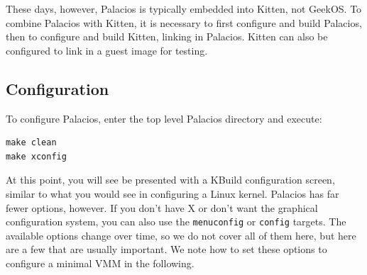 \documentclass[11pt]{article}
\begin{document}
These days, however, Palacios is typically embedded into Kitten, not
GeekOS.  To combine Palacios with Kitten, it is necessary to first
configure and build Palacios, then to configure and build Kitten,
linking in Palacios.   Kitten can also be configured to link in a
guest image for testing.  

\subsection{Configuration}

To configure Palacios, enter the top level Palacios directory and
execute:
\begin{verbatim}
make clean
make xconfig
\end{verbatim}
At this point, you will see be presented with a KBuild configuration
screen, similar to what you would see in configuring a Linux kernel.
Palacios has far fewer options, however.   If you don't have X or
don't want the graphical configuration system, you can also use the
\verb.menuconfig. or \verb.config. targets.  The available options
change over time, so we do not cover all of them here, but here are a
few that are usually important.  We note how to set these options to
configure a minimal VMM in the following.  
\end{document}
